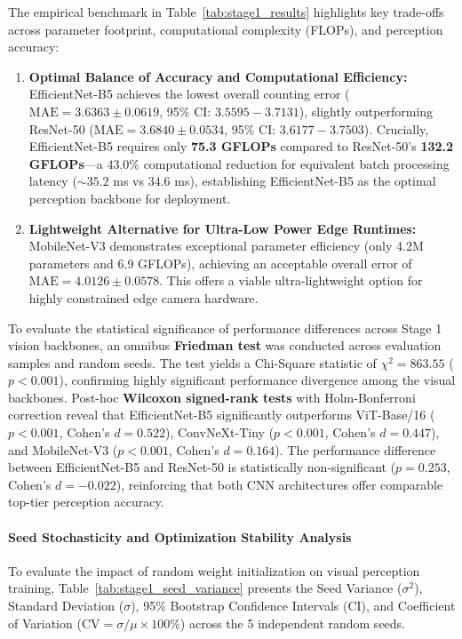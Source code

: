 \documentclass[journal,twocolumn]{IEEEtran}
\begin{document}
The empirical benchmark in Table~\ref{tab:stage1_results} highlights key trade-offs across parameter footprint, computational complexity (FLOPs), and perception accuracy:
\begin{enumerate}
    \item \textbf{Optimal Balance of Accuracy and Computational Efficiency:} EfficientNet-B5 achieves the lowest overall counting error ($\text{MAE} = 3.6363 \pm 0.0619$, 95\% CI: $3.5595 - 3.7131$), slightly outperforming ResNet-50 ($\text{MAE} = 3.6840 \pm 0.0534$, 95\% CI: $3.6177 - 3.7503$). Crucially, EfficientNet-B5 requires only \textbf{75.3 GFLOPs} compared to ResNet-50's \textbf{132.2 GFLOPs}—a $43.0\%$ computational reduction for equivalent batch processing latency ($\sim 35.2$ ms vs $34.6$ ms), establishing EfficientNet-B5 as the optimal perception backbone for deployment.
    \item \textbf{Lightweight Alternative for Ultra-Low Power Edge Runtimes:} MobileNet-V3 demonstrates exceptional parameter efficiency (only 4.2M parameters and 6.9 GFLOPs), achieving an acceptable overall error of $\text{MAE} = 4.0126 \pm 0.0578$. This offers a viable ultra-lightweight option for highly constrained edge camera hardware.
\end{enumerate}

To evaluate the statistical significance of performance differences across Stage 1 vision backbones, an omnibus \textbf{Friedman test} was conducted across evaluation samples and random seeds. The test yields a Chi-Square statistic of $\chi^2 = 863.55$ ($p < 0.001$), confirming highly significant performance divergence among the visual backbones. Post-hoc \textbf{Wilcoxon signed-rank tests} with Holm-Bonferroni correction reveal that EfficientNet-B5 significantly outperforms ViT-Base/16 ($p < 0.001$, Cohen's $d = 0.522$), ConvNeXt-Tiny ($p < 0.001$, Cohen's $d = 0.447$), and MobileNet-V3 ($p < 0.001$, Cohen's $d = 0.164$). The performance difference between EfficientNet-B5 and ResNet-50 is statistically non-significant ($p = 0.253$, Cohen's $d = -0.022$), reinforcing that both CNN architectures offer comparable top-tier perception accuracy.


\paragraph{Seed Stochasticity and Optimization Stability Analysis}
To evaluate the impact of random weight initialization on visual perception training, Table~\ref{tab:stage1_seed_variance} presents the Seed Variance ($\sigma^2$), Standard Deviation ($\sigma$), 95\% Bootstrap Confidence Intervals (CI), and Coefficient of Variation ($\text{CV} = \sigma / \mu \times 100\%$) across the 5 independent random seeds.
\end{document}
